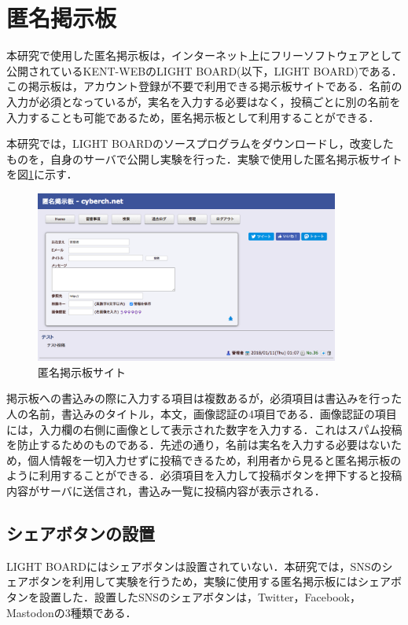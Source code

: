 \documentclass[10pt, a4paper]{jreport}
\begin{document}
\section{匿名掲示板}\label{sec: bbs}
本研究で使用した匿名掲示板は，インターネット上にフリーソフトウェアとして公開されているKENT-WEBのLIGHT BOARD(以下，LIGHT BOARD)である\cite{kent_web_bbs}．この掲示板は，アカウント登録が不要で利用できる掲示板サイトである．名前の入力が必須となっているが，実名を入力する必要はなく，投稿ごとに別の名前を入力することも可能であるため，匿名掲示板として利用することができる．

本研究では，LIGHT BOARDのソースプログラムをダウンロードし，改変したものを，自身のサーバで公開し実験を行った．実験で使用した匿名掲示板サイトを図\ref{fig: bbs_screenshot}に示す．

\begin{figure}[H]
	\begin{center}
		\includegraphics[width=100mm]{figures/bbs_screenshot.png}
	\end{center}
	\caption{匿名掲示板サイト}
	\label{fig: bbs_screenshot}
\end{figure}

掲示板への書込みの際に入力する項目は複数あるが，必須項目は書込みを行った人の名前，書込みのタイトル，本文，画像認証の4項目である．画像認証の項目には，入力欄の右側に画像として表示された数字を入力する．これはスパム投稿を防止するためのものである．先述の通り，名前は実名を入力する必要はないため，個人情報を一切入力せずに投稿できるため，利用者から見ると匿名掲示板のように利用することができる．必須項目を入力して投稿ボタンを押下すると投稿内容がサーバに送信され，書込み一覧に投稿内容が表示される．

\subsection{シェアボタンの設置}
LIGHT BOARDにはシェアボタンは設置されていない．本研究では，SNSのシェアボタンを利用して実験を行うため，実験に使用する匿名掲示板にはシェアボタンを設置した．設置したSNSのシェアボタンは，Twitter，Facebook，Mastodonの3種類である．
\end{document}
